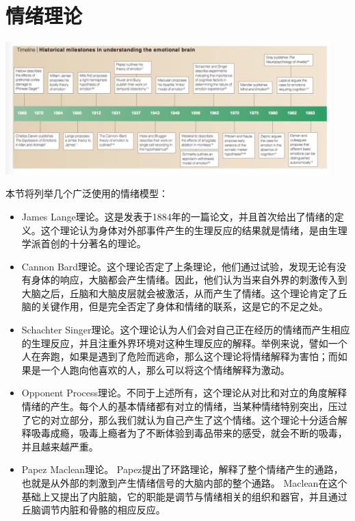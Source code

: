 \section{情绪理论}
	\centerline{\includegraphics[width=5in]{figure/timeline.png}}
	本节将列举几个广泛使用的情绪模型：
	\begin{itemize}
		\item James Lange理论。这是发表于1884年的一篇论文，并且首次给出了情绪的定义。这个理论认为身体对外部事件产生的生理反应的结果就是情绪，是由生理学派首创的十分著名的理论。
		\item Cannon Bard理论。这个理论否定了上条理论，他们通过试验，发现无论有没有身体的响应，大脑都会产生情绪。因此，他们认为当来自外界的刺激传入到大脑之后，丘脑和大脑皮层就会被激活，从而产生了情绪。这个理论肯定了丘脑的关键作用，但是完全否定了身体和情绪的联系，这是它的不足之处。
		\item Schachter Singer理论。这个理论认为人们会对自己正在经历的情绪而产生相应的生理反应，并且注重外界环境对这种生理反应的解释。举例来说，譬如一个人在奔跑，如果是遇到了危险而逃命，那么这个理论将情绪解释为害怕；而如果是一个人跑向他喜欢的人，那么可以将这个情绪解释为激动。
		\item Opponent Process理论。不同于上述所有，这个理论从对比和对立的角度解释情绪的产生。每个人的基本情绪都有对立的情绪，当某种情绪特别突出，压过了它的对立部分，那么我们就认为自己产生了这个情绪。这个理论十分适合解释吸毒成瘾，吸毒上瘾者为了不断体验到毒品带来的感受，就会不断的吸毒，并且越来越严重。
		\item Papez Maclean理论。 Papez提出了环路理论，解释了整个情绪产生的通路，也就是从外部的刺激到产生情绪信号的大脑内部的整个通路。 Maclean在这个基础上又提出了内脏脑，它的职能是调节与情绪相关的组织和器官，并且通过丘脑调节内脏和骨骼的相应反应。
	\end{itemize}
